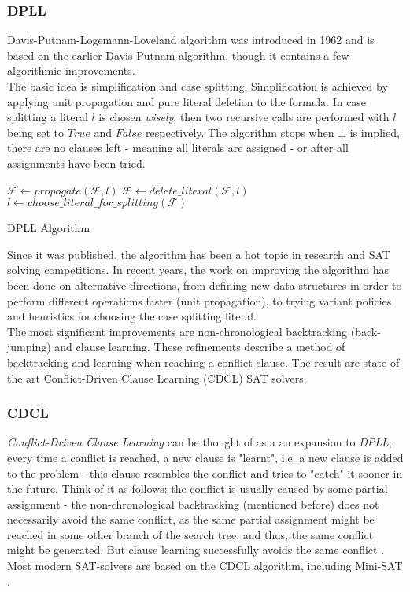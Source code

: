 \documentclass[]{article}
\begin{document}
	\subsubsection{DPLL}
	Davis-Putnam-Logemann-Loveland algorithm was introduced in 1962 and is based on the earlier Davis-Putnam algorithm, though it contains a few algorithmic improvements. \\
	The basic idea is simplification and case splitting. Simplification is achieved by applying unit propagation and pure literal deletion to the formula. In case splitting a literal $ l $ is chosen \textit{wisely}\cite{BranchingH}, then two recursive calls are performed with $ l $ being set to $ True $ and $ False $ respectively. The algorithm stops when $ \bot $ is implied, there are no clauses left - meaning all literals are assigned - or after all assignments have been tried.
	\\
	\begin{algorithm}[H]
		 {
			$ \mathcal{F} \leftarrow propogate(\mathcal{F}, l) $
		}
		 {
			$ \mathcal{F} \leftarrow delete\_literal(\mathcal{F}, l) $
		}
		$ l \leftarrow choose\_literal\_for\_splitting(\mathcal{F}) $ \\
	\caption{DPLL Algorithm}
	\end{algorithm}
	Since it was published, the algorithm has been a hot topic in research and SAT solving competitions. In recent years, the work on improving the algorithm has been done on alternative directions, from defining new data structures in order to perform different operations faster (unit propagation), to trying variant policies and heuristics for choosing the case splitting literal.\\ The most significant improvements are non-chronological backtracking (back-jumping) and clause learning. These refinements describe a method of backtracking and learning when reaching a conflict clause. The result are state of the art Conflict-Driven Clause Learning (CDCL) SAT solvers.

	\subsubsection{CDCL}
	\textit{Conflict-Driven Clause Learning} can be thought of as a an expansion to \textit{DPLL}; every time a conflict is reached, a new clause is "learnt", i.e. a new clause is added to the problem - this clause resembles the conflict and tries to "catch" it sooner in the future. Think of it as follows: the conflict is usually caused by some partial assignment - the non-chronological backtracking (mentioned before) does not necessarily avoid the same conflict, as the same partial assignment might be reached in some other branch of the search tree, and thus, the same conflict might be generated. But clause learning successfully avoids the same conflict \cite{PracticalSatSolving}. Most modern SAT-solvers are based on the CDCL algorithm, including Mini-SAT \cite{MinisatDoc}.
	
\end{document}
